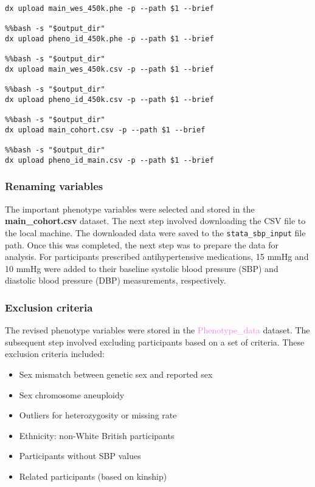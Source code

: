 \documentclass[11pt]{article}
\begin{document}
\begin{lstlisting}[style=PythonStyle]
%%bash -s "$output_dir"
dx upload main_wes_450k.phe -p --path $1 --brief

%%bash -s "$output_dir"
dx upload pheno_id_450k.phe -p --path $1 --brief

%%bash -s "$output_dir"
dx upload main_wes_450k.csv -p --path $1 --brief

%%bash -s "$output_dir"
dx upload pheno_id_450k.csv -p --path $1 --brief

%%bash -s "$output_dir"
dx upload main_cohort.csv -p --path $1 --brief

%%bash -s "$output_dir"
dx upload pheno_id_main.csv -p --path $1 --brief

\end{lstlisting}
\color{black}
\subsubsection{Renaming variables}
The important phenotype variables were selected and stored in the \textbf{main\_cohort.csv} dataset. The next step involved downloading the CSV file to the local machine. The downloaded data were saved to the \texttt{stata\_sbp\_input} file path. Once this was completed, the next step was to prepare the data for analysis. For participants prescribed antihypertensive medications, 15 mmHg and 10 mmHg were added to their baseline systolic blood pressure (SBP) and diastolic blood pressure (DBP) measurements, respectively\cite{tobin2005adjusting}. 
\color{violet} 
\begin{stlog}\end{stlog}
\color{black}
\newpage
\subsubsection{Exclusion criteria}
The revised phenotype variables were stored in the \textcolor{violet}{Phenotype\_data} dataset. The subsequent step involved excluding participants based on a set of criteria. These exclusion criteria included:
\begin{itemize}
    \item Sex mismatch between genetic sex and reported sex
    \item Sex chromosome aneuploidy
    \item Outliers for heterozygosity or missing rate
    \item Ethnicity: non-White British participants
    \item Participants without SBP values
    \item Related participants (based on kinship)
\end{itemize}
\color{violet}
\begin{stlog}\end{stlog}
\color{black}
\end{document}
